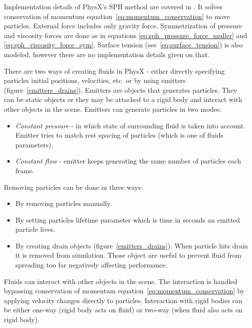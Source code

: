 Implementation details of PhysX's SPH method are covered in \cite{Harris08}. It solves conservation of momentum equation~\ref{eq:momentum_conservation} to move particles. External force includes only gravity force. Symmetrization of pressure and viscosity forces are done as in equations \ref{eq:sph_pressure_force_muller} and \ref{eq:sph_viscosity_force_sym}. Surface tension (see~\ref{eq:surface_tension}) is also modeled, however there are no implementation details given on that.

There are two ways of creating fluids in PhysX - either directly specifying particles initial positions, velocities, etc. or by using emitters (figure~\ref{emitters_drains}). Emitters are objects that generates particles. They can be static objects or they may be attached to a rigid body and interact with other objects in the scene. Emitters can generate particles in two modes:
\begin{itemize}\itemsep2pt
\item \textit{Constant pressure} - in which state of surrounding fluid is taken into account. Emitter tries to match rest spacing of particles (which is one of fluids parameters). 
\item \textit{Constant flow} - emitter keeps generating the same number of particles each frame. 
\end{itemize}


Removing particles can be done in three ways:
\begin{itemize}\itemsep2pt
\item By removing particles manually.
\item By setting particles lifetime parameter which is time in seconds an emitted particle lives.
\item By creating drain objects (figure~\ref{emitters_drains}). When particle hits drain it is removed from simulation. Those object are useful to prevent fluid from spreading too far negatively affecting performance.
\end{itemize}

Fluids can interact with other objects in the scene. The interaction is handled bypassing conservation of momentum equation~\ref{eq:momentum_conservation} by applying velocity changes directly to particles. Interaction with rigid bodies can be either one-way (rigid body acts on fluid) or two-way (when fluid also acts on rigid body).

